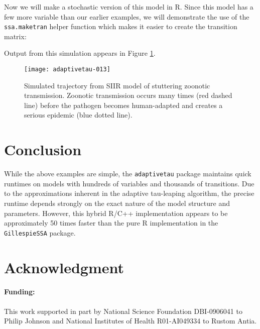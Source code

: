 \documentclass[11pt,nogin]{article}
\begin{document}
Now we will make a stochastic version of this model in R.  Since this model has a few more variable than our earlier examples, we will demonstrate the use of the \texttt{ssa.maketran} helper function which makes it easier to create the transition matrix:
\begin{Schunk}
\end{Schunk}
Output from this simulation appears in Figure \ref{fig-SIR}.
\begin{figure}
  \centerline{
\texttt{[image: adaptivetau-013]}
}\caption{\label{fig-SIR} Simulated trajectory from SIIR model of stuttering zoonotic transmission.  Zoonotic transmission occurs many times (red dashed line) before the pathogen becomes human-adapted and creates a serious epidemic (blue dotted line).}
\end{figure}


\section*{Conclusion}
While the above examples are simple, the \texttt{adaptivetau} package maintains quick runtimes on models with hundreds of variables and thousands of transitions. Due to the approximations inherent in the adaptive tau-leaping algorithm, the precise runtime depends strongly on the exact nature of the model structure and parameters. However, this hybrid R/C++ implementation appears to be approximately 50 times faster than the pure R implementation in the \texttt{GillespieSSA} package.


\section*{Acknowledgment}


\paragraph{Funding:}

This work supported in part by National Science Foundation DBI-0906041 to Philip Johnson and National Institutes of Health R01-AI049334 to Rustom Antia.



\end{document}
